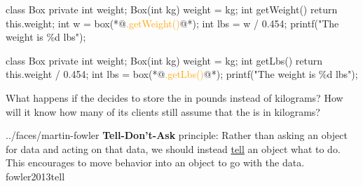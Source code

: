 \documentclass{article}
\begin{document}
\begin{pptWide}{2}
{\small\begin{ffcode}
class Box {
  private int weight;
  Box(int kg) { weight = kg; }
  int getWeight() {
    return this.weight;
  }
}
int w = box(*@\textcolor{orange}{.getWeight()}@*);
int lbs = w / 0.454;
printf("The weight is \%d lbs\n");
\end{ffcode}
}
\par\columnbreak\par
{\small\begin{ffcode}
class Box {
  private int weight;
  Box(int kg) { weight = kg; }
  int getLbs() {
    return this.weight / 0.454;
  }
}
int lbs = box(*@\textcolor{orange}{.getLbs()}@*);
printf("The weight is \%d lbs\n");
\end{ffcode}
}
\end{pptWide}
\par
What happens if the  decides to store the  in pounds instead of kilograms? How will it know how many of its clients still assume that the  is in kilograms?~\citep{bugayenko2014blog0916}
\plush{}


\qte
  {../faces/martin-fowler}
  {\textbf{Tell-Don't-Ask} principle: Rather than asking an object for data and acting on that data, we should instead \ul{tell} an object what to do. This encourages to move behavior into an object to go with the data.}
  {fowler2013tell}
\end{document}
